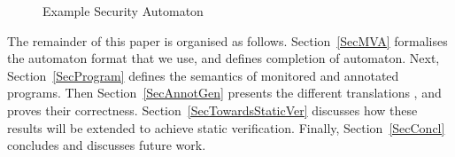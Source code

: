 \begin{figure}[t]
\begin{center}
\end{center}
\caption{Example Security Automaton}\label{FigExample}
\end{figure}

The remainder of this paper is organised as
follows. Section~\ref{SecMVA} formalises the automaton format that we
use, and defines completion of automaton. Next,
Section~\ref{SecProgram} defines the semantics of monitored and
annotated programs. Then Section~\ref{SecAnnotGen} presents the
different translations , and proves their
correctness. Section~\ref{SecTowardsStaticVer} discusses how these
results will be extended to achieve static verification. Finally,
Section~\ref{SecConcl} concludes and discusses future work.

